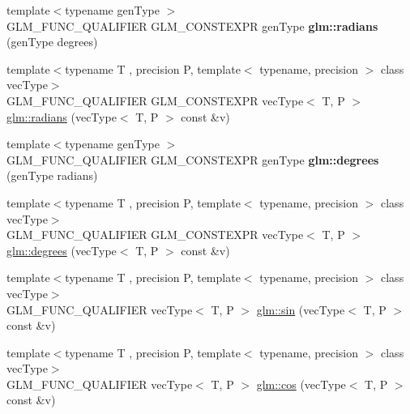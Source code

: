 \begin{DoxyCompactItemize}
\item 
\mbox{\label{func__trigonometric_8inl_a00577ee752441c79d5bb11d7c29e1627}} 
{\footnotesize template$<$typename gen\+Type $>$ }\\G\+L\+M\+\_\+\+F\+U\+N\+C\+\_\+\+Q\+U\+A\+L\+I\+F\+I\+ER G\+L\+M\+\_\+\+C\+O\+N\+S\+T\+E\+X\+PR gen\+Type {\bfseries glm\+::radians} (gen\+Type degrees)
\item 
{\footnotesize template$<$typename T , precision P, template$<$ typename, precision $>$ class vec\+Type$>$ }\\G\+L\+M\+\_\+\+F\+U\+N\+C\+\_\+\+Q\+U\+A\+L\+I\+F\+I\+ER G\+L\+M\+\_\+\+C\+O\+N\+S\+T\+E\+X\+PR vec\+Type$<$ T, P $>$ \hyperlink{group__core__func__trigonometric_gafffb5e533f75318bdf4e0967d8a6c05c}{glm\+::radians} (vec\+Type$<$ T, P $>$ const \&v)
\item 
\mbox{\label{func__trigonometric_8inl_a8a6fe45ac1da0ac1023bab706a675413}} 
{\footnotesize template$<$typename gen\+Type $>$ }\\G\+L\+M\+\_\+\+F\+U\+N\+C\+\_\+\+Q\+U\+A\+L\+I\+F\+I\+ER G\+L\+M\+\_\+\+C\+O\+N\+S\+T\+E\+X\+PR gen\+Type {\bfseries glm\+::degrees} (gen\+Type radians)
\item 
{\footnotesize template$<$typename T , precision P, template$<$ typename, precision $>$ class vec\+Type$>$ }\\G\+L\+M\+\_\+\+F\+U\+N\+C\+\_\+\+Q\+U\+A\+L\+I\+F\+I\+ER G\+L\+M\+\_\+\+C\+O\+N\+S\+T\+E\+X\+PR vec\+Type$<$ T, P $>$ \hyperlink{group__core__func__trigonometric_gabccdcc282134fd62af0ff3d6e4bb21f1}{glm\+::degrees} (vec\+Type$<$ T, P $>$ const \&v)
\item 
{\footnotesize template$<$typename T , precision P, template$<$ typename, precision $>$ class vec\+Type$>$ }\\G\+L\+M\+\_\+\+F\+U\+N\+C\+\_\+\+Q\+U\+A\+L\+I\+F\+I\+ER vec\+Type$<$ T, P $>$ \hyperlink{group__core__func__trigonometric_ga4a0ddceb6b1e64ce0e4da209dcb021d5}{glm\+::sin} (vec\+Type$<$ T, P $>$ const \&v)
\item 
{\footnotesize template$<$typename T , precision P, template$<$ typename, precision $>$ class vec\+Type$>$ }\\G\+L\+M\+\_\+\+F\+U\+N\+C\+\_\+\+Q\+U\+A\+L\+I\+F\+I\+ER vec\+Type$<$ T, P $>$ \hyperlink{group__core__func__trigonometric_ga728fd86f14609e37d83f82429995b7b3}{glm\+::cos} (vec\+Type$<$ T, P $>$ const \&v)

\end{DoxyCompactItemize}
